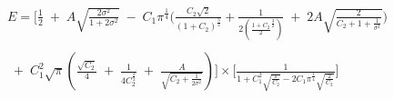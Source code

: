 \documentclass[12pt]{article}
\begin{document}
\newpage

\begin{equation}
\begin{split}
   E = \Big[ \frac{1}{2} \;+\; A \sqrt{\frac{2\sigma^2}{1 + 2\sigma^2}} \;-\; C_1 \pi^\frac{1}{4} \Big( \frac{C_2 \sqrt{2}}{(1 + C_2)^\frac{3}{2}} + \frac{1}{2 (\frac{1 + C_2}{2}^\frac{3}{2})} \;+\; 2A \sqrt{\frac{2}{C_2 + 1 + \frac{1}{\sigma^2}}} \Big) 
   \\
    \\
    \;+\; C_1^2 \sqrt{\pi} (\frac{\sqrt{C_2}}{4} \;+\; \frac{1}{4 C_2^\frac{3}{2}} \;+\; 
	\frac{A}{\sqrt{C_2 + \frac{1}{2 \sigma^2}}})\Big] \times \Big[ \frac{1}{1 + C_1^2 \sqrt{\frac{\pi}{C_2}} 
	- 2C_1 \pi^\frac{1}{4} \sqrt{\frac{2}{C_2}}} \Big]
\end{split}
\end{equation}
\end{document}
